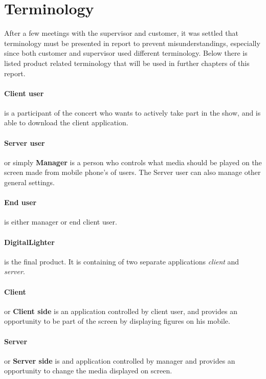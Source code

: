\section {Terminology}
\label{sec:terminology}
After a few meetings with the supervisor and customer, it was settled that terminology must be presented in report to prevent misunderstandings, especially since both customer and supervisor used different terminology.
Below there is listed product related terminology that will be used in further chapters of this report.

\paragraph{Client user}
is a participant of the concert who wants to actively take part in  the show, and is able to download the client application.

\paragraph{Server user}
or simply \textbf{Manager} is a person who controls what media should be played on the screen made from mobile phone's of users. 
The Server user can also manage other general settings.

\paragraph{End user} is either manager or end client user.

\paragraph{DigitalLighter}
is the final product. It is containing of two separate applications \emph{client} and \emph{server}.


\paragraph{Client} or \textbf{Client side} is an application controlled by client user, and provides an opportunity to be part of the screen by displaying figures on his mobile.

\paragraph{Server} or \textbf{Server side} is and application controlled by manager and provides an opportunity to change the media displayed on screen.

